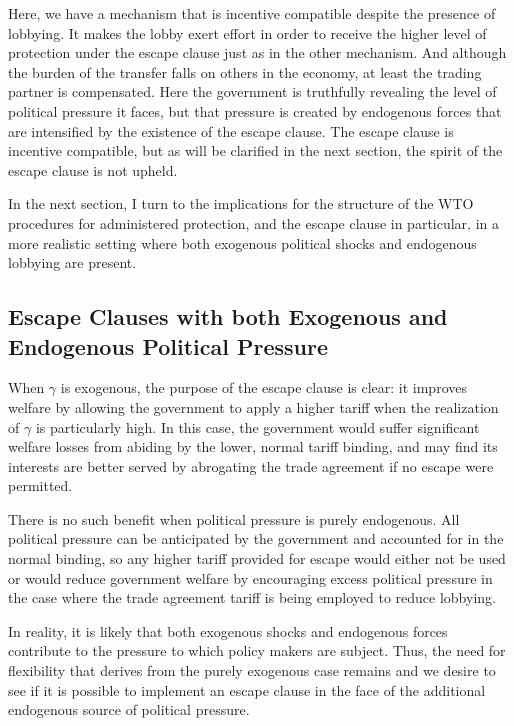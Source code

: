 \documentclass[12pt]{article}
\newcommand{\ga}{\gamma}
\begin{document}

Here, we have a mechanism that is incentive compatible despite the presence of lobbying. It makes the lobby exert effort in order to receive the higher level of protection under the escape clause just as in the other mechanism. And although the burden of the transfer falls on others in the economy, at least the trading partner is compensated. Here the government is truthfully revealing the level of political pressure it faces, but that pressure is created by endogenous forces that are intensified by the existence of the escape clause. The escape clause is incentive compatible, but as will be clarified in the next section, the spirit of the escape clause is not upheld.

In the next section, I turn to the implications for the structure of the WTO procedures for administered protection, and the escape clause in particular, in a more realistic setting where both exogenous political shocks and endogenous lobbying are present.


\subsection{Escape Clauses with both Exogenous and Endogenous Political Pressure}
\label{sec:escape2}
When $\ga$ is exogenous, the purpose of the escape clause is clear: it improves welfare by allowing the government to apply a higher tariff when the realization of $\ga$ is particularly high. In this case, the government would suffer significant welfare losses from abiding by the lower, normal tariff binding, and may find its interests are better served by abrogating the trade agreement if no escape were permitted.

There is no such benefit when political pressure is purely endogenous. All political pressure can be anticipated by the government and accounted for in the normal binding, so any higher tariff provided for escape would either not be used or would reduce government welfare by encouraging excess political pressure in the case where the trade agreement tariff is being employed to reduce lobbying.

In reality, it is likely that both exogenous shocks and endogenous forces contribute to the pressure to which policy makers are subject. Thus, the need for flexibility that derives from the purely exogenous case remains and we desire to see if it is possible to implement an escape clause in the face of the additional endogenous source of political pressure.
\end{document}
